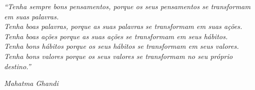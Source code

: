 \hfill
\begin{minipage}[t][20cm][b]{8cm}
  {\it ``Tenha sempre bons pensamentos, porque os seus pensamentos se transformam em suas palavras.\\
Tenha boas palavras, porque as suas palavras se transformam em suas ações.\\
Tenha boas ações porque as suas ações se transformam em seus hábitos.\\
Tenha bons hábitos porque os seus hábitos se transformam em seus valores.\\
Tenha bons valores porque os seus valores se transformam no seu próprio destino.''}

\vspace{.5cm}

\hspace{4.5cm}\textsl{Mahatma Ghandi}
\end{minipage}
